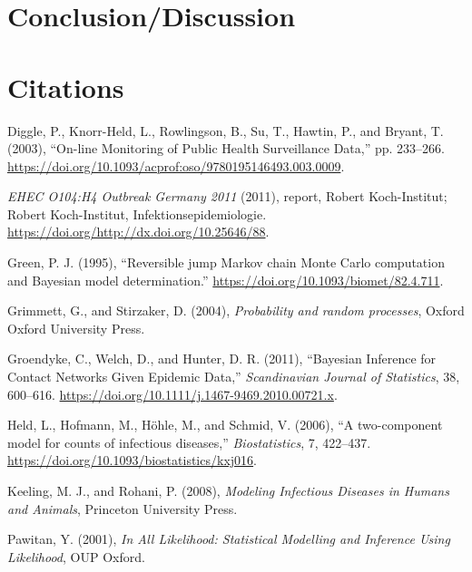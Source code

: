 \documentclass[]{article}
\numberwithin{equation}{section}
\begin{document}
\hypertarget{conclusiondiscussion}{%
\section{Conclusion/Discussion}\label{conclusiondiscussion}}

\hypertarget{citations}{%
\section*{Citations}\label{citations}}

\hypertarget{refs}{}
\leavevmode\hypertarget{ref-diggle_-line_2003}{}%
Diggle, P., Knorr-Held, L., Rowlingson, B., Su, T., Hawtin, P., and
Bryant, T. (2003), ``On-line Monitoring of Public Health Surveillance
Data,'' pp. 233--266.
\url{https://doi.org/10.1093/acprof:oso/9780195146493.003.0009}.

\leavevmode\hypertarget{ref-noauthor_ehec_2011}{}%
\emph{EHEC O104:H4 Outbreak Germany 2011} (2011), report, Robert
Koch-Institut; Robert Koch-Institut, Infektionsepidemiologie.
\url{https://doi.org/http://dx.doi.org/10.25646/88}.

\leavevmode\hypertarget{ref-green_reversible_1995}{}%
Green, P. J. (1995), ``Reversible jump Markov chain Monte Carlo
computation and Bayesian model determination.''
\url{https://doi.org/10.1093/biomet/82.4.711}.

\leavevmode\hypertarget{ref-grimmett_probability_2004}{}%
Grimmett, G., and Stirzaker, D. (2004), \emph{Probability and random
processes}, Oxford Oxford University Press.

\leavevmode\hypertarget{ref-groendyke_bayesian_2011}{}%
Groendyke, C., Welch, D., and Hunter, D. R. (2011), ``Bayesian Inference
for Contact Networks Given Epidemic Data,'' \emph{Scandinavian Journal
of Statistics}, 38, 600--616.
\url{https://doi.org/10.1111/j.1467-9469.2010.00721.x}.

\leavevmode\hypertarget{ref-held_two-component_2006}{}%
Held, L., Hofmann, M., Höhle, M., and Schmid, V. (2006), ``A
two-component model for counts of infectious diseases,''
\emph{Biostatistics}, 7, 422--437.
\url{https://doi.org/10.1093/biostatistics/kxj016}.

\leavevmode\hypertarget{ref-keeling_modeling_2008}{}%
Keeling, M. J., and Rohani, P. (2008), \emph{Modeling Infectious
Diseases in Humans and Animals}, Princeton University Press.

\leavevmode\hypertarget{ref-pawitan_all_2001}{}%
Pawitan, Y. (2001), \emph{In All Likelihood: Statistical Modelling and
Inference Using Likelihood}, OUP Oxford.
\end{document}
